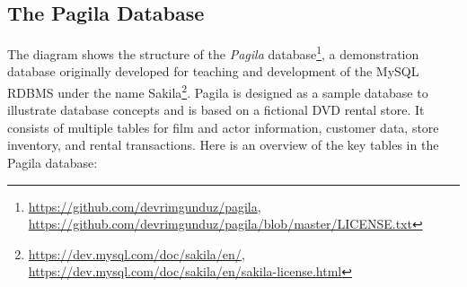 \begin{withcode}
\subsection*{The Pagila Database}

The diagram shows the structure of the \emph{Pagila} database\footnote{\url{https://github.com/devrimgunduz/pagila}, \\
\url{https://github.com/devrimgunduz/pagila/blob/master/LICENSE.txt}}, a demonstration database originally developed for teaching and development of the MySQL RDBMS under the name Sakila\footnote{\url{https://dev.mysql.com/doc/sakila/en/}, \\
\url{https://dev.mysql.com/doc/sakila/en/sakila-license.html}}. Pagila is designed as a sample database to illustrate database concepts and is based on a fictional DVD rental store. It consists of multiple tables for film and actor information, customer data, store inventory, and rental transactions. Here is an overview of the key tables in the Pagila database:


\end{withcode}
